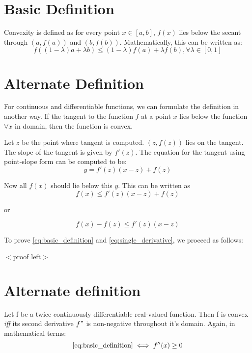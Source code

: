 \documentclass{article}
\begin{document}
	
	\section{Basic Definition}
	Convexity is defined as for every point $x \in [a,b]$, $f(x)$ lies below the secant through $(a, f(a))$ and $(b, f(b))$.  
	Mathematically, this can be written as:
	\begin{equation}\label{eq:basic_definition}
		f((1-\lambda)a + \lambda b) \leq (1-\lambda)f(a) + \lambda f(b), \forall \lambda \in [0,1]
	\end{equation}
	
	\section{Alternate Definition}
	For continuous and differentiable functions, we can formulate the definition in another way. If the tangent to the function $f$ at a point $x$  lies below the function $\forall x$ in domain, then the function is convex. 
	
	Let $z$ be the point where tangent is computed. $(z, f(z))$ lies on the tangent. The slope of the tangent is given by $f'(z)$. The equation for the tangent using point-slope form can be computed to be:
	\begin{equation}
		y = f'(z) (x - z) + f(z)
	\end{equation}
	
	Now all $f(x)$ should lie below this $y$. This can be written as
	\begin{equation*}
	  f(x) \leq f'(z) (x - z) + f(z)
	\end{equation*}
	
	or
	
	\begin{equation}\label{eq:single_derivative}
	  f(x) - f(z) \leq f'(z) (x - z) 
	\end{equation}
	
	To prove \eqref{eq:basic_definition} and \eqref{eq:single_derivative}, we proceed as follows:
	
	$<$proof left$>$
	\section{Alternate definition}
	Let f be a twice continuously differentiable real-valued function. Then f is convex \emph{iff} its second derivative $f"$ is non-negative throughout it's domain.
	Again, in mathematical terms:
	\begin{equation*}
		\eqref{eq:basic_definition} \iff f''(x) \geq 0 
	\end{equation*}
	
\end{document}
